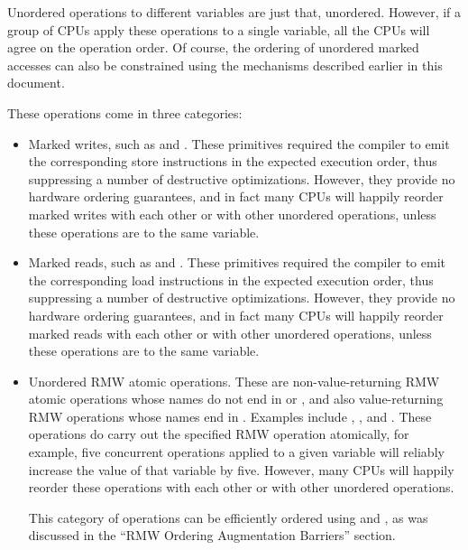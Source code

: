 Unordered operations to different variables are just that, unordered.
However, if a group of CPUs apply these operations to a single variable,
all the CPUs will agree on the operation order.
Of course, the ordering of unordered marked accesses can also be
constrained using the mechanisms described earlier in this document.

These operations come in three categories:

\begin{itemize}
 \item	Marked writes, such as  and .
	These primitives required the compiler to emit the corresponding store
	instructions in the expected execution order, thus suppressing
	a number of destructive optimizations.
	However, they provide no hardware ordering guarantees, and in
	fact many CPUs will happily reorder marked writes with each other
	or with other unordered operations, unless these operations are
	to the same variable.

 \item	Marked reads, such as  and .
	These primitives required the compiler to emit the corresponding load
	instructions in the expected execution order, thus suppressing
	a number of destructive optimizations.
	However, they provide no hardware ordering guarantees, and in
	fact many CPUs will happily reorder marked reads with each other
	or with other unordered operations, unless these operations are
	to the same variable.

 \item	Unordered RMW atomic operations.
	These are non-value-returning RMW atomic operations whose names
	do not end in  or , and also
	value-returning RMW operations whose names end in .
	Examples include , ,
	and .
	These operations do carry out the specified RMW operation atomically,
	for example, five concurrent  operations applied
	to a given variable will reliably increase the value of that
	variable by five.
	However, many CPUs will happily reorder these operations with
	each other or with other unordered operations.

	This category of operations can be efficiently ordered using
	 and , as was
	discussed in the ``RMW Ordering Augmentation Barriers'' section.
\end{itemize}

